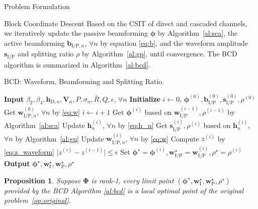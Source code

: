 \documentclass[journal]{IEEEtran}
\newtheorem{proposition}{Proposition}
\begin{document}
\begin{section}{Problem Formulation}
		\begin{subsection}{Block Coordinate Descent}
			Based on the CSIT of direct and cascaded channels, we iteratively update the passive beamforming $\boldsymbol{\phi}$ by Algorithm~\ref{al:sca}, the active beamforming $\boldsymbol{b}_{\mathrm{I/P},n}$, $\forall n$ by equation \eqref{eq:b}, and the waveform amplitude $\boldsymbol{s}_{\mathrm{I/P}}$ and splitting ratio $\rho$ by Algorithm~\ref{al:gp}, until convergence. The BCD algorithm is summarized in Algorithm~\ref{al:bcd}.
			\begin{algorithm}[!t]
				\caption{BCD: Waveform, Beamforming and Splitting Ratio.}
				\label{al:bcd}
				\begin{algorithmic}[1]
					\State \textbf{Input} $\beta_2,\beta_4,\boldsymbol{h}_{\mathrm{D},n},\boldsymbol{V}_{n},P,\sigma_n,\bar{R},Q,\epsilon$, $\forall n$
					\State \textbf{Initialize} $i \gets 0$, $\boldsymbol{\phi}^{(0)},\boldsymbol{b}_{\mathrm{I/P}}^{(0)},\boldsymbol{s}_{\mathrm{I/P}}^{(0)},\rho^{(0)}$
					\State Get $\boldsymbol{w}_{\mathrm{I/P},n}^{(0)}$, $\forall n$ by \eqref{eq:w}
					\Repeat
						\State $i \gets i + 1$
						\State Get $\boldsymbol{\phi}^{(i)}$ based on $\boldsymbol{w}_{\mathrm{I/P}}^{(i-1)},\rho^{(i-1)}$ by Algorithm~\ref{al:sca}
						\State Update $\boldsymbol{h}_n^{(i)}$, $\forall n$ by \eqref{eq:h_n}
						\State Get $\boldsymbol{s}_{\mathrm{I/P}}^{(i)},\rho^{(i)}$ based on $\boldsymbol{h}_n^{(i)}$, $\forall n$ by Algorithm~\ref{al:gp}
						\State Update $\boldsymbol{w}_{\mathrm{I/P},n}^{(i)}$, $\forall n$ by \eqref{eq:w}
						\State Compute $z^{(i)}$ by \eqref{eq:z_waveform}
					\Until $\lvert z^{(i)} - z^{(i-1)} \rvert \le \epsilon$
					\State Set $\boldsymbol{\phi}^{\star}=\boldsymbol{\phi}^{(i)},\boldsymbol{w}_{\mathrm{I/P}}^{\star}=\boldsymbol{w}_{\mathrm{I/P}}^{(i)},\rho^{\star}=\rho^{(i)}$
					\State \textbf{Output} $\boldsymbol{\phi}^{\star},\boldsymbol{w}_{\mathrm{I}}^{\star},\boldsymbol{w}_{\mathrm{P}}^{\star},\rho^{\star}$
				\end{algorithmic}
			\end{algorithm}

			\begin{proposition}\label{pr:bcd}
				Suppose $\boldsymbol{\Phi}$ is rank-\num{1}, every limit point $(\boldsymbol{\phi}^{\star},\boldsymbol{w}_{\mathrm{I}}^{\star},\boldsymbol{w}_{\mathrm{P}}^{\star},\rho^{\star})$ provided by the BCD Algorithm \ref{al:bcd} is a local optimal point of the original problem~\eqref{op:original}.
			\end{proposition}


\end{subsection}
\end{section}
\end{document}
